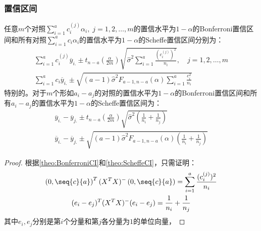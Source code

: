 \subsubsection{置信区间}
\begin{theorem}
	任意$m$个对照$\sum\limits_{i=1}^{a}c_i^{(j)}\alpha_i,\;j=1,2,\dots,m$的置信水平为$1-\alpha$的Bonferroni置信区间和所有对照$\sum\limits_{i=1}^{a}c_i\alpha_i$的置信水平为$1-\alpha$的Scheffe置信区间分别为：
	\begin{gather*}
		\sum_{i=1}^{a}c_i^{(j)}\overline{y}_{i.}\pm t_{n-a}\left(\frac{\alpha}{2m}\right)\sqrt{\hat{\sigma}^2\sum_{i=1}^{a}\frac{(c_i^{(j)})^2}{n_i}},\quad j=1,2,\dots,m \\
		\sum_{i=1}^{a}c_i\overline{y}_{i.}\pm\sqrt{(a-1)\hat{\sigma}^2F_{a-1,n-a}(\alpha)\sum_{i=1}^{a}\frac{c_i^2}{n_i}}
	\end{gather*}
	特别的。对于$m$个形如$a_i-a_j$的对照的置信水平为$1-\alpha$的Bonferroni置信区间和所有$a_i-a_j$的置信水平为$1-\alpha$的Scheffe置信区间为：
	\begin{gather*}
		\overline{y}_{i.}-\overline{y}_{j.}\pm t_{n-a}\left(\frac{\alpha}{2m}\right)\sqrt{\hat{\sigma}^2\left(\frac{1}{n_i}+\frac{1}{n_j}\right)} \\
		\overline{y}_{i.}-\overline{y}_{j.}\pm\sqrt{(a-1)\hat{\sigma}^2F_{a-1,n-a}(\alpha)\left(\frac{1}{n_i}+\frac{1}{n_j}\right)}
	\end{gather*}
\end{theorem}
\begin{proof}
	根据\cref{theo:BonferroniCI}和\cref{theo:ScheffeCI}，只需证明：
	\begin{gather*}
		\left(0,\seq{c}{a}\right)^T(X^TX)^-\left(0,\seq{c}{a}\right)=\sum_{i=1}^{a}\frac{(c_i^{(j)})^2}{n_i} \\
		(e_i-e_j)^T(X^TX)^-(e_i-e_j)=\frac{1}{n_i}+\frac{1}{n_j}
	\end{gather*}
	其中$e_i,e_j$分别是第$i$个分量和第$j$各分量为$1$的单位向量，
\end{proof}


